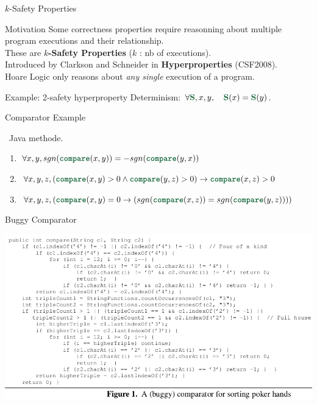 \documentclass[page number]{beamer}
\begin{document}
\begin{frame}{$k$-Safety Properties}
  \begin{alertblock}{Motivation}
    Some correctness properties require reasonning about multiple program executions and their relationship.\\
    These are \textbf{$k$-Safety Properties} ($k$ : nb of executions).\\
    Introduced by Clarkson and Schneider in \textbf{Hyperproperties} (CSF2008).\\
    Hoare Logic only reasons about \textit{any single} execution of a program.
  \end{alertblock}
  \vfill
  \begin{exampleblock}{Example: 2-safety hyperproperty}
    Determinism: $\forall \prog{S},x,y,\quad\prog{S}(x) = \prog{S}(y)$.
  \end{exampleblock}
\end{frame}

\def\comp{}

\begin{frame}{Comparator Example}

  \comp\ Java methode.
  \begin{enumerate}
  \item $\forall x,y, sgn(\comp(x,y)) = -sgn(\comp(y,x))$
  \item $\forall x,y,z, (\comp(x,y)>0\wedge \comp(y,z)>0)\rightarrow \comp(x,z)>0$
  \item $\forall x,y,z, (\comp(x,y)=0\rightarrow (sgn(\comp(x,z))=sgn(\comp(y,z))))$
  \end{enumerate}
\end{frame}

\begin{frame}{Buggy Comparator}
  \begin{center}
    \includegraphics[scale=0.4]{img_sousa/buggycomp.png}
  \end{center}
\end{frame}
\end{document}
